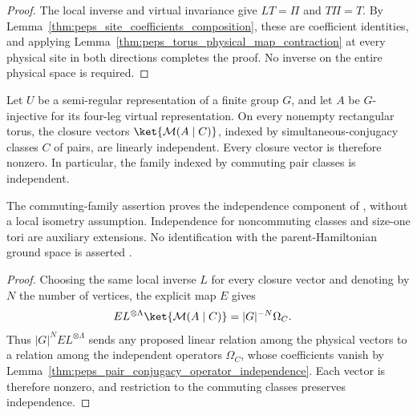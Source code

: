\begin{proof}\leanok
    The local inverse and virtual invariance give $LT=\Pi$ and
    $T\Pi=T$. By Lemma~\ref{thm:peps_site_coefficients_composition},
    these are coefficient identities, and applying
    Lemma~\ref{thm:peps_torus_physical_map_contraction} at every
    physical site in both directions completes the proof. No inverse on the entire
    physical space is required.
\end{proof}

\begin{lemma}%
    \label{thm:peps_semiregular_g_injective_closure_independence}
    \leanok
    Let $U$ be a semi-regular representation of a finite group $G$,
    and let $A$ be $G$-injective for its four-leg virtual representation.
    On every nonempty rectangular torus, the closure vectors
    $\ket{\mathcal M(A\mid C)}$, indexed by simultaneous-conjugacy
    classes $C$ of pairs, are linearly independent. Every closure
    vector is therefore nonzero. In particular, the family indexed
    by commuting pair classes is independent.

    The commuting-family assertion proves the independence component
    of \cite[Theorem~5.9]{Schuch2010PEPS}, without a local isometry
    assumption. Independence for noncommuting classes and size-one
    tori are auxiliary extensions. No identification with the
    parent-Hamiltonian ground space is asserted
    \cite{gap:rmp_peps_quantum_double_g_isometry}.
\end{lemma}

\begin{proof}\leanok
    Choosing the same local inverse $L$ for every closure vector and denoting by $N$ the number of vertices, the explicit map $E$ gives
    \begin{align}
        E L^{\otimes\Lambda}\ket{\mathcal M(A\mid C)}
         & =|G|^{-N}\Omega_C.
        \label{eq:peps_semiregular_closure_extraction}
    \end{align}
    Thus $|G|^N E L^{\otimes\Lambda}$ sends any proposed linear
    relation among the physical vectors to a relation among the
    independent operators $\Omega_C$, whose coefficients vanish by
    Lemma~\ref{thm:peps_pair_conjugacy_operator_independence}.
    Each vector is therefore nonzero, and restriction to the commuting classes
    preserves independence.
\end{proof}

